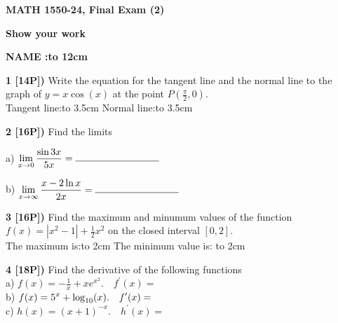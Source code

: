 \documentclass[12pt]{article}
\begin{document}
\centerline{\bf MATH 1550-24, Final Exam (2)}%
\centerline{\bf Show your work}

\vspace{.25in}

{\large\bf NAME :\hbox to 12cm{\hrulefill}}


\vspace{.25in}

{\bf 1 [14P])} Write the equation for the tangent line and the
normal line to the graph of 
  $\displaystyle{y = x \cos (x)}$
at the point $P(\frac{\pi}{2},0)$.
\\ 
Tangent line:\hbox to 3.5cm{\hrulefill}\hspace{1.5cm}
Normal line:\hbox to 3.5cm{\hrulefill}\hfill
\\ 



\vspace{.25in}

{\bf 2 [16P])}  Find the limits

a) ${\displaystyle \lim_{x\to 0}\frac{\sin 3x}{5x}=
\hbox to 3cm{\hrulefill}}$


b) ${\displaystyle \lim_{x\to \infty}\frac{x-2\ln x}{2x}=
\hbox to 3cm{\hrulefill}}$

\vspace{.25in}

{\bf 3 [16P])} Find the maximum and minumum values of
the function 
$\displaystyle{f(x) = |x^2-1| +\frac{1}{2}x^2}$ on the
closed interval $\displaystyle{[0,2]}$.
\\ %
The maximum is:\hbox to 2cm{\hrulefill}\hspace{1.5cm}
The minimum value is: \hbox to 2cm{\hrulefill}


\vspace{.25in}

{\bf 4 [18P])} Find the derivative of the following functions\\

a) ${\displaystyle f(x) = -\frac{1}{x} + xe^{x^2}. \quad f^\prime (x) = }$
\\

b) ${\displaystyle f(x) =  5^x + {\rm log}_{10}(x). \quad
f^\prime (x) = }$
\\

c)  ${\displaystyle h(x) =  (x+1)^{-x} . \quad
h^\prime (x) = }$
\end{document}
